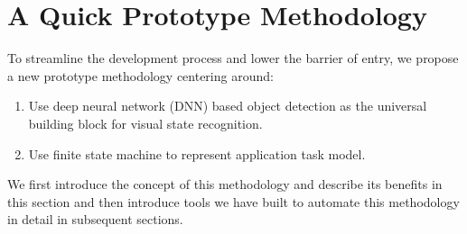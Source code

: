 



\section{A Quick Prototype Methodology}

To streamline the development process and lower the barrier of entry, we propose
a new prototype methodology centering around:
\begin{enumerate}
  \item  Use deep neural network (DNN) based object detection as the universal
  building block for visual state recognition.
  \item Use finite state machine to represent application task model.
\end{enumerate}
We first introduce the concept of this methodology and describe its benefits in
this section and then introduce tools we have built to automate this methodology
in detail in subsequent sections.


